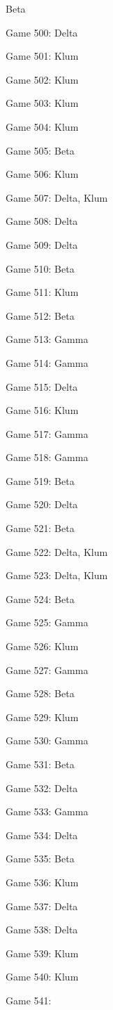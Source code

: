 \documentclass{article}
\begin{document}
\begin{multicols}{3}
\begin{compactitem}
Beta
\item Game 500:
Delta
\item Game 501:
Klum
\item Game 502:
Klum
\item Game 503:
Klum
\item Game 504:
Klum
\item Game 505:
Beta
\item Game 506:
Klum
\item Game 507:
Delta, Klum
\item Game 508:
Delta
\item Game 509:
Delta
\item Game 510:
Beta
\item Game 511:
Klum
\item Game 512:
Beta
\item Game 513:
Gamma
\item Game 514:
Gamma
\item Game 515:
Delta
\item Game 516:
Klum
\item Game 517:
Gamma
\item Game 518:
Gamma
\item Game 519:
Beta
\item Game 520:
Delta
\item Game 521:
Beta
\item Game 522:
Delta, Klum
\item Game 523:
Delta, Klum
\item Game 524:
Beta
\item Game 525:
Gamma
\item Game 526:
Klum
\item Game 527:
Gamma
\item Game 528:
Beta
\item Game 529:
Klum
\item Game 530:
Gamma
\item Game 531:
Beta
\item Game 532:
Delta
\item Game 533:
Gamma
\item Game 534:
Delta
\item Game 535:
Beta
\item Game 536:
Klum
\item Game 537:
Delta
\item Game 538:
Delta
\item Game 539:
Klum
\item Game 540:
Klum
\item Game 541:

\end{compactitem}
\end{multicols}
\end{document}

